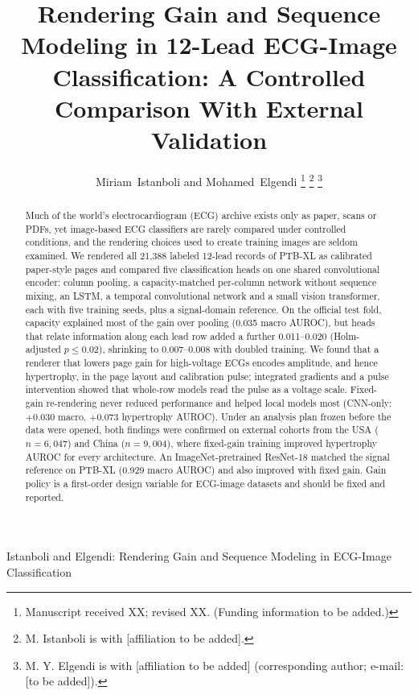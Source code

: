 \documentclass[journal]{IEEEtran}
\begin{document}
\title{Rendering Gain and Sequence Modeling in 12-Lead ECG-Image Classification: A Controlled Comparison With External Validation}

\author{Miriam~Istanboli and Mohamed~Elgendi%
\thanks{Manuscript received XX; revised XX. (Funding information to be added.)}%
\thanks{M. Istanboli is with [affiliation to be added].}%
\thanks{M. Y. Elgendi is with [affiliation to be added] (corresponding author; e-mail: [to be added]).}}

%
{Istanboli and Elgendi: Rendering Gain and Sequence Modeling in ECG-Image Classification}

\maketitle

\begin{abstract}
Much of the world's electrocardiogram (ECG) archive exists only as paper, scans or PDFs, yet image-based ECG classifiers are rarely compared under controlled conditions, and the rendering choices used to create training images are seldom examined. We rendered all 21{,}388 labeled 12-lead records of PTB-XL as calibrated paper-style pages and compared five classification heads on one shared convolutional encoder: column pooling, a capacity-matched per-column network without sequence mixing, an LSTM, a temporal convolutional network and a small vision transformer, each with five training seeds, plus a signal-domain reference. On the official test fold, capacity explained most of the gain over pooling (0.035 macro AUROC), but heads that relate information along each lead row added a further 0.011--0.020 (Holm-adjusted $p\le0.02$), shrinking to 0.007--0.008 with doubled training. We found that a renderer that lowers page gain for high-voltage ECGs encodes amplitude, and hence hypertrophy, in the page layout and calibration pulse; integrated gradients and a pulse intervention showed that whole-row models read the pulse as a voltage scale. Fixed-gain re-rendering never reduced performance and helped local models most (CNN-only: $+0.030$ macro, $+0.073$ hypertrophy AUROC). Under an analysis plan frozen before the data were opened, both findings were confirmed on external cohorts from the USA ($n=6{,}047$) and China ($n=9{,}004$), where fixed-gain training improved hypertrophy AUROC for every architecture. An ImageNet-pretrained ResNet-18 matched the signal reference on PTB-XL (0.929 macro AUROC) and also improved with fixed gain. Gain policy is a first-order design variable for ECG-image datasets and should be fixed and reported.
\end{abstract}
\end{document}
